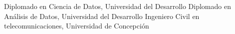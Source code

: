 %
%
%


\begin{scholarship}
					{Diplomado en Ciencia de Datos, Universidad del Desarrollo}
					{Diplomado en Análisis de Datos, Universidad del Desarrollo}
					{Ingeniero Civil en telecomunicaciones, Universidad de Concepción}
\end{scholarship}
